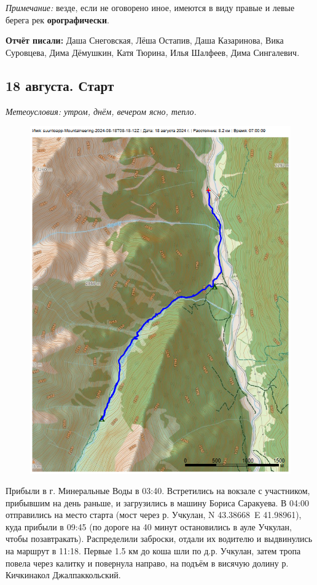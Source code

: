 \textit{Примечание:} везде, если не оговорено иное, имеются в виду правые и левые берега рек \textbf{орографически}.

\textbf{Отчёт писали:} Даша Снеговская, Лёша Остапив, Даша Казаринова, Вика Суровцева, Дима Дёмушкин, Катя Тюрина, Илья Шалфеев, Дима Сингалевич.
\subsection{18 августа. Старт}
\textit{Метеоусловия: утром, днём, вечером ясно, тепло.}

\begin{figure}[h!]
	\centering
	\includegraphics[angle=0, width=0.7\linewidth]{../pics/mini_maps/18}
	\label{fig:mini_18}
\end{figure}

Прибыли в г. Минеральные Воды в 03:40. Встретились на вокзале с участником, прибывшим на день раньше, и загрузились в машину Бориса Саракуева. В 04:00 отправились на место старта (мост через р. Учкулан, N 43.38668\degree~E 41.98961\degree), куда прибыли в 09:45 (по дороге на 40 минут остановились в ауле Учкулан, чтобы позавтракать). Распределили заброски, отдали их водителю и выдвинулись на маршрут в 11:18. Первые 1.5 км до коша шли по д.р. Учкулан, затем тропа повела через калитку и повернула направо, на подъём в висячую долину р. Кичкинакол Джалпаккольский.

